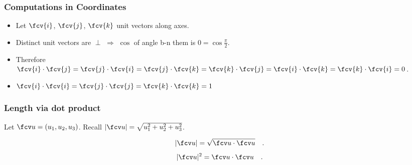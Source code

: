 \begin{frame}
\frametitle{Computations in Coordinates}
\begin{itemize}
\item<1-> Let $\fcv{i}$, $\fcv{j}$, $\fcv{k}$ unit vectors along axes.
\item<2-> Distinct unit vectors are $\perp$ $\Rightarrow$ $\cos$ of angle b-n them is $0=\cos \frac{\pi}{2}$.
\item<3-> Therefore \alert<7>{$ \fcv{i} \cdot \fcv{j} = \fcv{j} \cdot \fcv{i} = \fcv{j} \cdot \fcv{k}= \fcv{k} \cdot \fcv{j} = \fcv{i} \cdot \fcv{k} = \fcv{k} \cdot \fcv{i} = 0$}.
\item<4-> \alert<8>{$\fcv{i} \cdot \fcv{i} = \fcv{j} \cdot \fcv{j} = \fcv{k} \cdot \fcv{k} = 1$}
\end{itemize}
\end{frame}

\begin{frame}
\frametitle{Length via dot product}
Let $\fcv u=( u_1, u_2, u_3)$. Recall $|\fcv u|=\sqrt{u_1^2+u_2^2+u_3^2}$.
\begin{observation}
\[
|\fcv u|= \sqrt{ \fcv u \cdot \fcv u}\quad .
\]
\[
|\fcv u|^2= \fcv u \cdot \fcv u\quad .
\]
\end{observation}
\end{frame}
